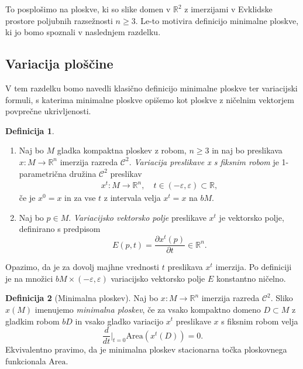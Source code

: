 \documentclass[12pt,a4paper,twoside]{article}
\theoremstyle{definition} %
\newtheorem{definicija}{Definicija}[section]
\theoremstyle{plain} %
\numberwithin{equation}{section}  %
\newcommand{\R}{\mathbb R}
\begin{document}
To posplošimo na ploskve, ki so slike domen v $\R^2$ z imerzijami v Evklidske prostore poljubnih razsežnosti $n \geq 3$. Le-to motivira definicijo minimalne ploskve, ki jo bomo spoznali v naslednjem razdelku.

\subsection{Variacija ploščine}
V tem razdelku bomo navedli klasično definicijo minimalne ploskve ter variacijski formuli, s katerima minimalne ploskve opišemo kot ploskve z ničelnim vektorjem povprečne ukrivljenosti.
%
\begin{definicija} \label{def:variacija}
\begin{enumerate}
\item
Naj bo $M$ gladka kompaktna ploskev z robom, $n \geq 3$ in naj bo preslikava $x \colon M \to \R^{n}$ imerzija razreda $\mathcal{C}^2$. \emph{Variacija preslikave x s fiksnim robom} je 1-parametrična družina $\mathcal{C}^2$ preslikav 
\begin{gather}
x^{t} \colon M \to \R^{n}, \quad t \in (-\varepsilon, \varepsilon) \subset \R,
\end{gather}
če je $x^0 = x$ in za vse $t$ z intervala velja $x^{t} = x$ na $bM$.
%
\item
Naj bo $p \in M$. \emph{Variacijsko vektorsko polje} preslikave $x^{t}$ je vektorsko polje, definirano s predpisom
\begin{equation}
E(p,t) = \frac{\partial{x^t(p)}}{\partial{t}} \in \R^{n}.
\end{equation}
\end{enumerate}
\end{definicija}

Opazimo, da je za dovolj majhne vrednosti $t$ preslikava $x^{t}$ imerzija.
Po definiciji je na množici $bM \times (-\varepsilon, \varepsilon)$ variacijsko vektorsko polje $E$ konstantno ničelno.

\begin{definicija} [Minimalna ploskev] \label{def:min-ploskev}
Naj bo $x \colon M \to \R^{n}$ imerzija razreda $\mathcal{C}^2$. Sliko $x(M)$ imenujemo \emph{minimalna ploskev}, če za vsako kompaktno domeno $D \subset M$ z gladkim robom $bD$ in vsako gladko variacijo $x^{t}$ preslikave $x$ s fiksnim robom velja
\begin{equation} \label{eq:1-var-ploščine}
\frac{d}{dt} \Big|_{t=0} \text{Area} \left(x^{t}(D)\right) = 0.
\end{equation}
Ekvivalentno pravimo, da je minimalna ploskev stacionarna točka ploskovnega funkcionala $\text{Area}$.
\end{definicija}
\end{document}
